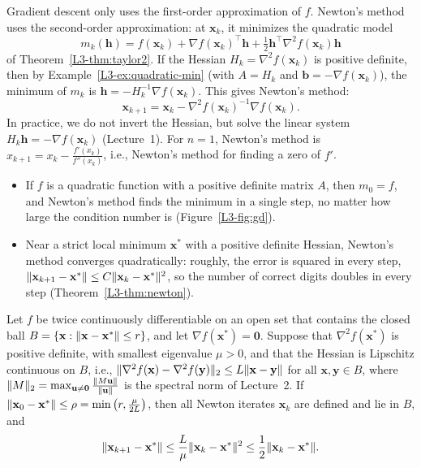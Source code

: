 Gradient descent only uses the first-order approximation of $f$. Newton's method uses the second-order approximation: at $\mathbf{x}_k$, it minimizes the quadratic model
\[m_k(\mathbf{h}) = f(\mathbf{x}_k) + \nabla f(\mathbf{x}_k)^\top\mathbf{h} + \tfrac{1}{2}\mathbf{h}^\top\nabla^2 f(\mathbf{x}_k)\mathbf{h}\]
of Theorem~\ref{L3-thm:taylor2}. If the Hessian $H_k = \nabla^2 f(\mathbf{x}_k)$ is positive definite, then by Example~\ref{L3-ex:quadratic-min} (with $A = H_k$ and $\mathbf{b} = -\nabla f(\mathbf{x}_k)$), the minimum of $m_k$ is $\mathbf{h} = -H_k^{-1}\nabla f(\mathbf{x}_k)$. This gives Newton's method:
\[\mathbf{x}_{k+1} = \mathbf{x}_k - \nabla^2 f(\mathbf{x}_k)^{-1}\nabla f(\mathbf{x}_k).\]
In practice, we do not invert the Hessian, but solve the linear system $H_k\mathbf{h} = -\nabla f(\mathbf{x}_k)$ (Lecture~1). For $n = 1$, Newton's method is $x_{k+1} = x_k - \frac{f'(x_k)}{f''(x_k)}$, i.e., Newton's method for finding a zero of $f'$.
\begin{itemize}
    \item If $f$ is a quadratic function with a positive definite matrix $A$, then $m_0 = f$, and Newton's method finds the minimum in a single step, no matter how large the condition number is (Figure~\ref{L3-fig:gd}).
    \item Near a strict local minimum $\mathbf{x}^*$ with a positive definite Hessian, Newton's method converges quadratically: roughly, the error is squared in every step, $\lVert \mathbf{x}_{k+1} - \mathbf{x}^* \rVert \leq C\lVert \mathbf{x}_k - \mathbf{x}^* \rVert^2$, so the number of correct digits doubles in every step (Theorem~\ref{L3-thm:newton}).
\end{itemize}

\begin{theorem}\label{L3-thm:newton}
    Let $f$ be twice continuously differentiable on an open set that contains the closed ball $B = \{\mathbf{x} : \lVert \mathbf{x} - \mathbf{x}^* \rVert \leq r\}$, and let $\nabla f(\mathbf{x}^*) = \mathbf{0}$. Suppose that $\nabla^2 f(\mathbf{x}^*)$ is positive definite, with smallest eigenvalue $\mu > 0$, and that the Hessian is Lipschitz continuous on $B$, i.e., $\lVert \nabla^2 f(\mathbf{x}) - \nabla^2 f(\mathbf{y}) \rVert_2 \leq L\lVert \mathbf{x} - \mathbf{y} \rVert$ for all $\mathbf{x}, \mathbf{y} \in B$, where $\lVert M \rVert_2 = \max_{\mathbf{u} \neq \mathbf{0}} \frac{\lVert M\mathbf{u} \rVert}{\lVert \mathbf{u} \rVert}$ is the spectral norm of Lecture~2. If $\lVert \mathbf{x}_0 - \mathbf{x}^* \rVert \leq \rho = \min\big(r, \frac{\mu}{2L}\big)$, then all Newton iterates $\mathbf{x}_k$ are defined and lie in $B$, and
    \[\lVert \mathbf{x}_{k+1} - \mathbf{x}^* \rVert \leq \frac{L}{\mu}\lVert \mathbf{x}_k - \mathbf{x}^* \rVert^2 \leq \frac{1}{2}\lVert \mathbf{x}_k - \mathbf{x}^* \rVert.\]
\end{theorem}

